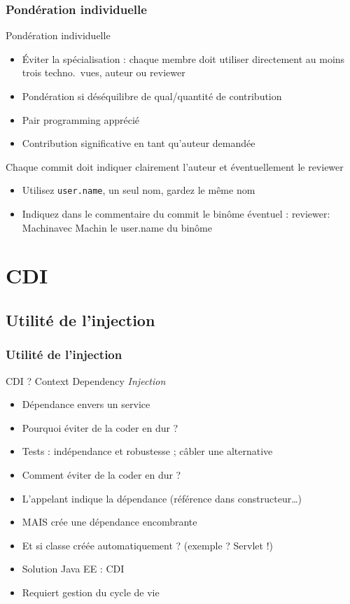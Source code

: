 \documentclass[english, french]{beamer}
\begin{document}
\begin{frame}
	\frametitle{Pondération individuelle}
	\begin{block}{Pondération individuelle}
		\begin{itemize}
			\item Éviter la spécialisation : chaque membre doit utiliser directement au moins trois techno.\ vues, auteur ou reviewer
			\item Pondération si déséquilibre de qual/quantité de contribution
			\item Pair programming apprécié
			\item Contribution significative en tant qu’auteur demandée
		\end{itemize}
	\end{block}
	Chaque commit doit indiquer clairement l’auteur et éventuellement le reviewer
	\begin{itemize}
		\item Utilisez \texttt{user.name}, \alert{un seul nom}, \alert{gardez le même nom}
		\item Indiquez dans le commentaire du commit le binôme éventuel : \og\alert{reviewer: Machin}\fg avec Machin le user.name du binôme
	\end{itemize}
\end{frame}

\section{CDI}
\subsection{Utilité de l’injection}
\begin{frame}
	\frametitle{Utilité de l’injection}
	CDI ? \pause Context Dependency \emph{Injection}\pause
	\begin{itemize}
		\item Dépendance envers un service
		\item Pourquoi éviter de la coder en dur ? \pause
		\item Tests : indépendance et robustesse ; câbler une alternative \pause
		\item Comment éviter de la coder en dur ? \pause
		\item L’appelant indique la dépendance (référence dans constructeur…) \pause
		\item MAIS crée une dépendance encombrante
		\item Et si classe créée automatiquement ? (exemple ? \pause Servlet !)
		\item Solution Java EE : CDI
		\item Requiert gestion du cycle de vie
	\end{itemize}
\end{frame}
\end{document}
